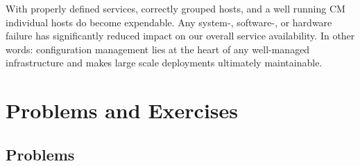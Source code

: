 With properly defined services, correctly grouped
hosts, and a well running CM individual hosts do
become expendable.  Any system-, software-, or
hardware failure has significantly reduced impact on
our overall service availability.  In other words:
configuration management lies at the heart of any
well-managed infrastructure and makes large scale
deployments ultimately maintainable.

\vfill
\pagebreak

\chapter*{Problems and Exercises}
\section*{Problems}

